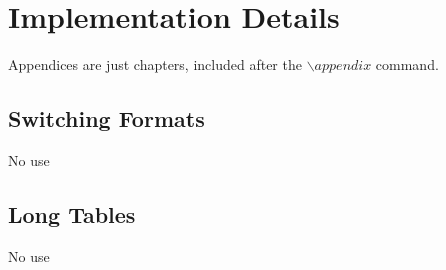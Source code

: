 \chapter{Implementation Details\label{ch:implementation}}

Appendices are just chapters, included after the $\backslash appendix$ command.

\section{Switching Formats}
No use

\section{Long Tables}

No use
